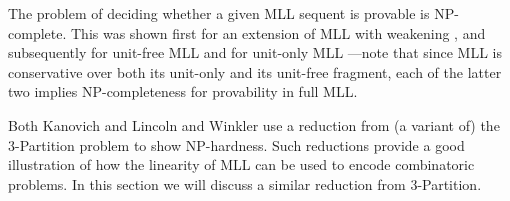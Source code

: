 \documentclass{lmcs}
\let\capsabbrev=\uppercase
\begin{document}
The problem of deciding whether a given \capsabbrev{mll} sequent is provable is \capsabbrev{np}-complete. This was shown first for an extension of \capsabbrev{mll} with weakening \cite{Lincoln-Mitchell-Scedrov-Shankar-1992}, and subsequently for unit-free \capsabbrev{mll} \cite{Kanovich-1992} and for unit-only  \capsabbrev{mll} \cite{Lincoln-Winkler-1994}---note that since \capsabbrev{mll} is conservative over both its unit-only and its unit-free fragment, each of the latter two implies \capsabbrev{np}-completeness for provability in full \capsabbrev{mll}.

Both Kanovich \cite{Kanovich-1992} and Lincoln and Winkler \cite{Lincoln-Winkler-1994} use a reduction from (a variant of) the 3-Partition problem to show  \capsabbrev{np}-hardness. Such reductions provide a good illustration of how the linearity of \capsabbrev{mll} can be used to encode combinatoric problems. In this section we will discuss a similar reduction from 3-Partition.
\end{document}
